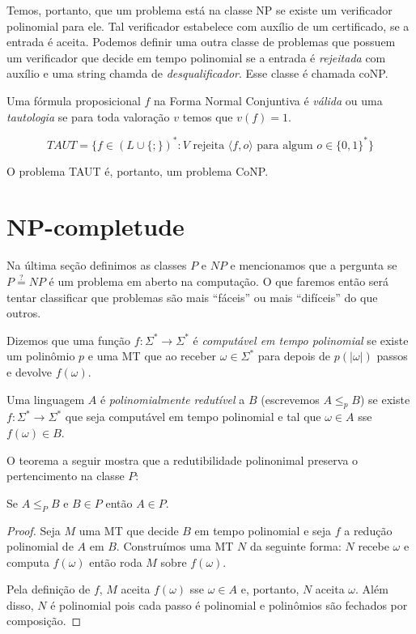 Temos, portanto, que um problema está na classe NP se existe um verificador polinomial para ele.
Tal verificador estabelece com auxílio de um certificado, se a entrada é aceita.
Podemos definir uma outra classe de problemas que possuem um verificador que decide em tempo polinomial se a entrada é {\em rejeitada} com auxílio e uma string chamda de {\em desqualificador}.
Esse classe é chamada coNP.

\begin{example}
  Uma fórmula proposicional $f$ na Forma Normal Conjuntiva é {\em válida} ou uma {\em tautologia} se para toda valoração $v$ temos que $v(f) = 1$.

  \begin{displaymath}
    TAUT = \{f \in (L \cup \{;\})^*: \textrm{$V$ rejeita $\langle f, o \rangle$ para algum $o \in \{0,1\}^*$}\}
  \end{displaymath}

  O problema TAUT é, portanto, um problema CoNP.
\end{example}

\section{NP-completude}
\label{sec:np-completude}

Na última seção definimos as classes $P$ e $NP$ e mencionamos que a pergunta se $P \stackrel{?}{=} NP$ é um problema em aberto na computação.
O que faremos então será tentar classificar que problemas são mais ``fáceis'' ou mais ``difíceis'' do que outros.

Dizemos que uma função $f : \Sigma^* \to \Sigma^*$ é {\em computável em tempo polinomial} se existe um polinômio $p$ e uma MT que ao receber $\omega \in \Sigma^*$ para depois de $p(|\omega|)$ passos e devolve $f(\omega)$.

Uma linguagem $A$ é {\em polinomialmente redutível} a $B$ (escrevemos $A \leq_p B$) se existe $f: \Sigma^* \to \Sigma^*$ que seja computável em tempo polinomial e tal que $\omega \in A$ sse $f(\omega) \in B$.

O teorema a seguir mostra que a redutibilidade polinonimal preserva o pertencimento na classe $P$:

\begin{theorem}
  Se $A \leq_P B$ e $B \in P$ então $A \in P$.
\end{theorem}
\begin{proof}
  Seja $M$ uma MT que decide $B$ em tempo polinomial e seja $f$ a redução polinomial de $A$ em $B$.
  Construímos uma MT $N$ da seguinte forma: $N$ recebe $\omega$ e computa $f(\omega)$ então roda $M$ sobre $f(\omega)$.

  Pela definição de $f$, $M$ aceita $f(\omega)$ sse $\omega \in A$ e, portanto, $N$ aceita $\omega$.
  Além disso, $N$ é polinomial pois cada passo é polinomial e polinômios são fechados por composição.
\end{proof}

